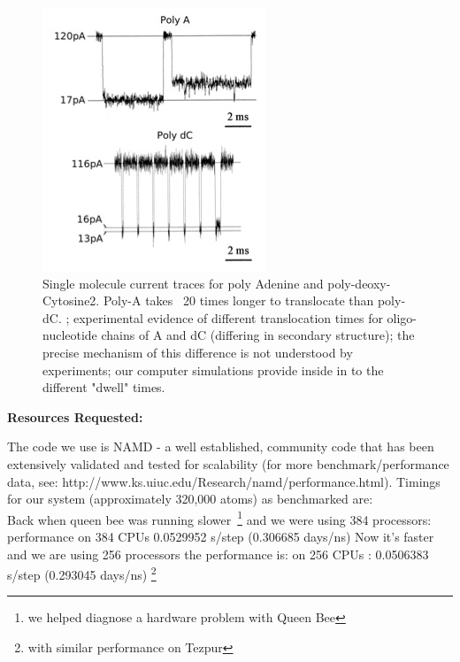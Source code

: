 \documentclass[a4paper,10pt]{article}
\begin{document}
\begin{figure}
\begin{center}
\includegraphics[scale=0.60]{polyA_polydC.jpg}
\end{center}
\caption{Single molecule current traces for poly Adenine and poly-deoxy-Cytosine2.
Poly-A takes ~20 times longer to translocate than poly-dC.
; experimental evidence of different translocation times for oligo-nucleotide chains
of A and dC (differing in secondary structure); the precise mechanism of this
difference is not understood by experiments; our computer simulations provide
inside in to the different "dwell" times.}
\label{}
\end{figure}


{\bf Resources Requested:}

The code we use is NAMD - a well established, community code that has been
extensively validated and tested for scalability (for more
benchmark/performance data, see:
http://www.ks.uiuc.edu/Research/namd/performance.html). Timings for our system
(approximately 320,000 atoms) as benchmarked are: \\
Back when queen bee was running slower~\footnote{we helped diagnose
a hardware problem with Queen Bee} and we were using 384 processors: \\ %
  \indent performance on 384 CPUs 0.0529952 s/step (0.306685 days/ns) \newline
Now it's faster and we are using 256 processors the performance is: \newline
  \indent on 256 CPUs : 0.0506383 s/step (0.293045 days/ns)  \footnote{with similar performance on Tezpur}
\end{document}
